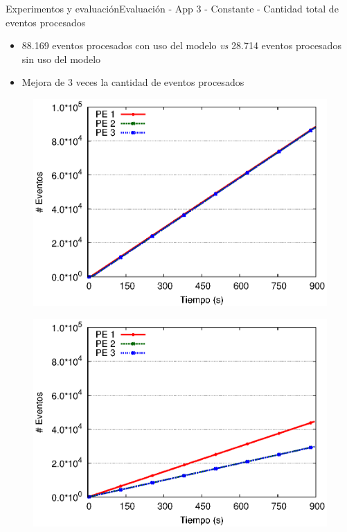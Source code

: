 \begin{frame}{Experimentos y evaluación}{Evaluación - App 3 - Constante - Cantidad total de eventos procesados}

\begin{itemize}
\item 88.169 eventos procesados con uso del modelo \textit{vs} 28.714 eventos procesados sin uso del modelo
\item Mejora de 3 veces la cantidad de eventos procesados
\end{itemize}

\begin{multicols}{2}
\begin{figure}[p]
	\centering
	\includegraphics[scale=0.475]{images/exp/app3/cm/logical/eventCount.eps}
\end{figure}

\begin{figure}[p]
	\centering
	\includegraphics[scale=0.475]{images/exp/app3/sm/logical/eventCount.eps}
\end{figure}
\end{multicols}
\end{frame}

